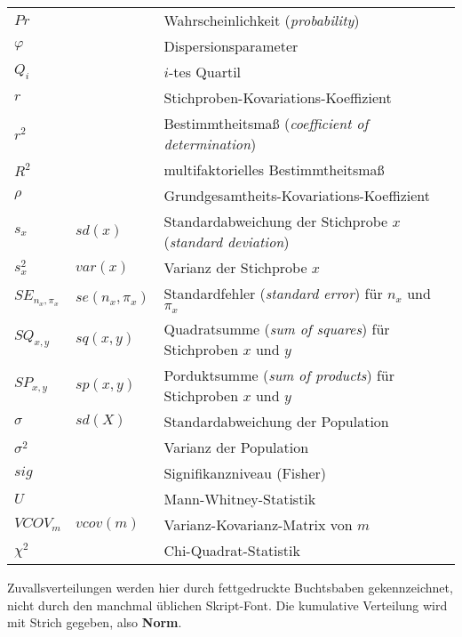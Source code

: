 \begin{longtable}{p{}p{}p{}}
  $Pr$              &              & Wahrscheinlichkeit (\textit{probability}) \\
  $\varphi$         &              & Dispersionsparameter \\
  $Q_i$             &              & $i$-tes Quartil \\
  $r$               &              & Stichproben-Kovariations-Koeffizient \\
  $r^2$             &              & Bestimmtheitsmaß (\textit{coefficient of determination}) \\
  $R^2$             &              & multifaktorielles Bestimmtheitsmaß \\
  $\rho$            &              & Grundgesamtheits-Kovariations-Koeffizient \\
  $s_x$             & $sd(x)$      & Standardabweichung der Stichprobe $x$ (\textit{standard deviation}) \\
  $s^2_x$           & $var(x)$     & Varianz der Stichprobe $x$ \\
  $SE_{n_x,\pi_x}$      & $se(n_x, \pi_x)$ & Standardfehler (\textit{standard error}) für $n_x$ und $\pi_x$ \\
  $SQ_{x,y}$        & $sq(x, y)$   & Quadratsumme (\textit{sum of squares}) für Stichproben $x$ und $y$ \\
  $SP_{x,y}$        & $sp(x, y)$   & Porduktsumme (\textit{sum of products}) für Stichproben $x$ und $y$ \\
  $\sigma$          & $sd(X)$      & Standardabweichung der Population \\
  $\sigma^2$        &              & Varianz der Population \\
  $sig$             &              & Signifikanzniveau (Fisher) \\
  $U$               &              & Mann-Whitney-Statistik \\
  $VCOV_m$          & $vcov(m)$    & Varianz-Kovarianz-Matrix von $m$ \\
  $\chi^2$          &              & Chi-Quadrat-Statistik \\
\end{longtable}

\vspace{\baselineskip}
\noindent Zuvallsverteilungen werden hier durch fettgedruckte Buchtsbaben gekennzeichnet, nicht durch den manchmal üblichen Skript-Font.
Die kumulative Verteilung wird mit Strich gegeben, also \textbf{Norm\Prime}.
\vspace{\baselineskip}

